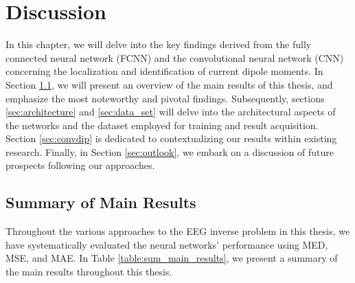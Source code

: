 \documentclass[a4paper, UKenglish, 11pt]{uiomaster}
\begin{document}
\chapter{Discussion}
In this chapter, we will delve into the key findings derived from the fully connected neural network (FCNN) and the convolutional neural network (CNN) concerning the localization and identification of current dipole moments. In Section \ref{sec:results}, we will present an overview of the main results of this thesis, and emphasize the most noteworthy and pivotal findings. Subsequently, sections \ref{sec:architecture} and \ref{sec:data_set} will delve into the architectural aspects of the networks and the dataset employed for training and result acquisition. Section \ref{sec:convdip} is dedicated to contextualizing our results within existing research. Finally, in Section \ref{sec:outlook}, we embark on a discussion of future prospects following our approaches.



\section{Summary of Main Results} \label{sec:results}
Throughout the various approaches to the EEG inverse problem in this thesis, we have systematically evaluated the neural networks' performance using MED, MSE, and MAE. In Table \ref{table:sum_main_results}, we present a summary of the main results throughout this thesis.
\end{document}
